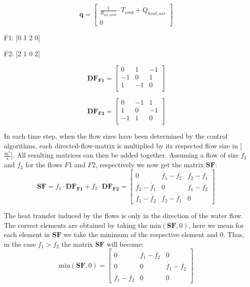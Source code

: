 \begin{equation}
	\mathbf{\dot{q}} =
	\begin{bmatrix}
		\frac{1}{R_{air, amb}} \cdot T_{amb} + \dot{Q}_{heat, air} \\
		0
	\end{bmatrix}
\end{equation}


F1: [0 1 2 0]

F2: [2 1 0 2]

\begin{equation}
	\mathbf{DF_{F1}} = 
	\begin{bmatrix}
		0 & 1 &-1  \\
	   -1 & 0 & 1  \\
		1 &-1 & 0  \\
	\end{bmatrix}
	\label{eq:DFflow1}
\end{equation}

\begin{equation}
	\mathbf{DF_{F2}} = 
	\begin{bmatrix}
		0 &-1 & 1  \\
	    1 & 0 &-1  \\
	   -1 & 1 & 0  \\
	\end{bmatrix}
	\label{eq:DFflow1}
\end{equation}

In each time step, when the flow sizes have been determined by the control algorithms, each directed-flow-matrix is multiplied by its respected flow size in [$\frac{\text{m}^3}{\text{s}}$]. All resulting matrices can then be added together. Assuming a flow of size $f_1$ and $f_2$ for the flows $F1$ and $F2$, respectively we now get the matrix $\mathbf{SF}$:
\begin{equation}
	\mathbf{SF} = f_1 \cdot \mathbf{DF_{F1}} + f_2 \cdot \mathbf{DF_{F2}} = 
	\begin{bmatrix}
		0     & \dot{f_1}-\dot{f_2} & \dot{f_2}-\dot{f_1} \\
    \dot{ f_2}-\dot{f_1}  & 0       & \dot{f_1}-\dot{f_2} \\
     \dot{f_1}-\dot{f_2}  & \dot{f_2}-\dot{f_1} & 0       
	\end{bmatrix}
	\label{eq:addbufferflows}
\end{equation}

The heat transfer induced by the flows is only in the direction of the water flow. The correct elements are obtained by taking the $\text{min}(\mathbf{SF},0)$, here we mean for each element in $\mathbf{SF}$ we take the minimum of the respective element and 0. Thus, in the case $f_1>f_2$ the matrix $\mathbf{SF}$ will become:
\begin{equation}
	\text{min}(\mathbf{SF},0) =  \begin{bmatrix}
		0     & \dot{f_1}-\dot{f_2} & 0 \\
        0     & 0       & \dot{f_1}-\dot{f_2} \\
     \dot{f_1}-\dot{f_2}  & 0       & 0     
	\end{bmatrix}
	\label{eq:minSFzero}
\end{equation}

